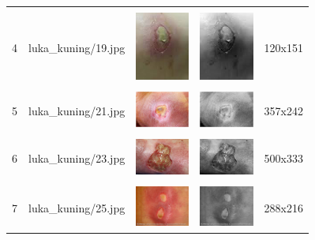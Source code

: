 \begin{table}[H]
\begin{tabular}{|m{0.2in}|m{1.2in}|m{0.7in}|m{0.7in}|m{0.7in}|}
		& &  &  &\\
		4& 
		luka\_kuning/19.jpg &
		\includegraphics[width=0.7in]{dataset/dataset_3/luka_kuning/ready/19.jpg}&
		\includegraphics[width=0.7in]{dataset/dataset_3/luka_kuning/ready/19_gray.jpg}&
		120x151\\
		\hline
		
		& &  &  &\\
		5& 
		luka\_kuning/21.jpg &
		\includegraphics[width=0.7in]{dataset/dataset_3/luka_kuning/ready/21.jpg}&
		\includegraphics[width=0.7in]{dataset/dataset_3/luka_kuning/ready/21_gray.jpg}&
		357x242\\
		\hline
		
		& &  &  &\\
		6& 
		luka\_kuning/23.jpg &
		\includegraphics[width=0.7in]{dataset/dataset_3/luka_kuning/ready/23.jpg}&
		\includegraphics[width=0.7in]{dataset/dataset_3/luka_kuning/ready/23_gray.jpg}&
		500x333\\
		\hline
		
		& &  &  &\\
		7& 
		luka\_kuning/25.jpg &
		\includegraphics[width=0.7in]{dataset/dataset_3/luka_kuning/ready/25.jpg}&
		\includegraphics[width=0.7in]{dataset/dataset_3/luka_kuning/ready/25_gray.jpg}&
		288x216\\
		\hline
	\end{tabular}
\end{table}


